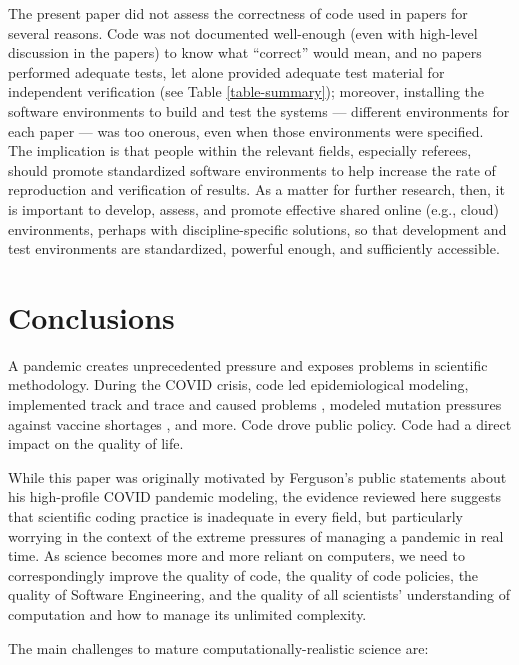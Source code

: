 \documentclass{comjnl}
\begin{document}
The present paper did not assess the correctness of code used in papers for several reasons. Code was not documented well-enough (even with high-level discussion in the papers) to know what ``correct'' would mean, and no papers performed adequate tests, let alone provided adequate test material for independent verification (see Table \ref{table-summary}); moreover, installing the software environments to build and test the systems --- different environments for each paper --- was too onerous, even when those environments were specified. The implication is that people within the relevant fields, especially referees, should promote standardized software environments to help increase the rate of reproduction and verification of results. As a matter for further research, then, it is important to develop, assess, and promote effective shared online (e.g., cloud) environments, perhaps with discipline-specific solutions, so that development and test environments are standardized, powerful enough, and sufficiently accessible.

\section{Conclusions}
A pandemic creates unprecedented pressure and exposes problems in scientific methodology. During the COVID crisis, code led epidemiological modeling, implemented track and trace and caused problems \cite{excel-fiasco}, modeled mutation pressures against vaccine shortages \cite{science-delays}, and more. Code drove public policy. Code had a direct impact on the quality of life. 

While this paper was originally motivated by Ferguson's public statements  about his high-profile COVID pandemic modeling, the evidence reviewed here suggests that scientific coding practice is inadequate in every field, but particularly worrying in the context of the extreme pressures of managing a pandemic in real time. As science becomes more and more reliant on computers, we need to correspondingly improve the quality of code, the quality of code policies, the quality of Software Engineering, and the quality of all scientists' understanding of computation and how to manage its unlimited complexity. 

The main challenges to mature computationally-realistic science are:
\end{document}
